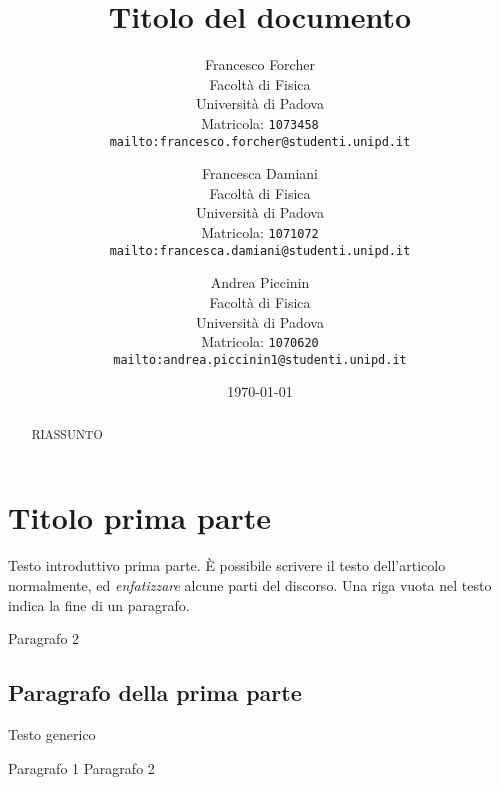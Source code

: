 \documentclass[12pt]{article} %
\title{Titolo del documento}
\author{Francesco Forcher\\ %
Facoltà di Fisica\\
Università di Padova\\
Matricola: \texttt{1073458}\\
\texttt{mailto:francesco.forcher@studenti.unipd.it}\\
\and
Francesca Damiani\\ %
Facoltà di Fisica\\
Università di Padova\\
Matricola: \texttt{1071072}\\
\texttt{mailto:francesca.damiani@studenti.unipd.it}\\
\and
Andrea Piccinin\\ %
Facoltà di Fisica\\
Università di Padova\\
Matricola: \texttt{1070620}\\
\texttt{mailto:andrea.piccinin1@studenti.unipd.it}\\
}
\date{\today}
\begin{document}
\maketitle %
\tableofcontents %


\begin{abstract} %
	RIASSUNTO
\end{abstract}


\section{Titolo prima parte}
	Testo introduttivo prima parte.
	È possibile scrivere il testo dell'articolo normalmente, ed \emph{enfatizzare} alcune parti del discorso. %
	Una riga vuota nel testo indica la fine di un paragrafo.
 	
	Paragrafo 2


\subsection{Paragrafo della prima parte}
	Testo generico

	Paragrafo 1
	\linebreak[4] %
	Paragrafo 2 
\end{document}
